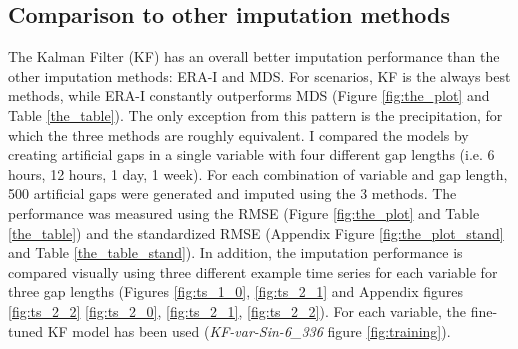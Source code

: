\documentclass{article}
\let\Oldsubsection\subsection
\renewcommand{\subsection}{\FloatBarrier\Oldsubsection}
\begin{document}


\subsection{Comparison to other imputation methods}

The Kalman Filter (KF) has an overall better imputation performance than the other imputation methods: ERA-I and MDS. For scenarios, KF is the always best methods, while ERA-I constantly outperforms MDS (Figure \ref{fig:the_plot} and Table \ref{the_table}). The only exception from this pattern is the precipitation, for which the three methods are roughly equivalent.
I compared the models by creating artificial gaps in a single variable with four different gap lengths (i.e. 6 hours, 12 hours, 1 day, 1 week). For each combination of variable and gap length, 500 artificial gaps were generated and imputed using the 3 methods. The performance was measured using the RMSE (Figure \ref{fig:the_plot} and Table \ref{the_table}) and the standardized RMSE (Appendix Figure \ref{fig:the_plot_stand} and Table \ref{the_table_stand}). In addition, the imputation performance is compared visually using three different example time series for each variable for three gap lengths (Figures \ref{fig:ts_1_0}, \ref{fig:ts_2_1} and Appendix figures \ref{fig:ts_2_2} \ref{fig:ts_2_0}, \ref{fig:ts_2_1}, \ref{fig:ts_2_2}). For each variable, the fine-tuned KF model has been used (\textit{KF-\textlangle var\textrangle-Sin-6\_336} figure \ref{fig:training}).
\end{document}
